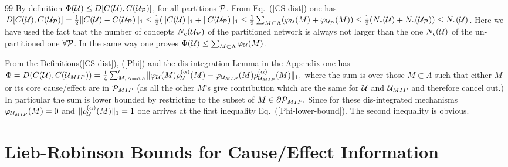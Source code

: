 \documentclass[aps,pra,groupaddress]{revtex4-1}
\begin{document}
\begin{thebibliography}{99}
By definition $\Phi({\cal U})\le D[ C({\cal U}), C({\cal U}_{\cal P})]$,  for all partitions $\cal P$.
From Eq.~(\ref{CS-dist}) one has $D[ C({\cal U}), C({\cal U}_{\cal P})]= \frac{1}{2}\| C({\cal U}) -C({\cal U}_{\cal P}) \|_1\le \frac{1}{2} (\| C({\cal U}) \|_1+\| C({\cal U}_{\cal P}) \|_1\le \frac{1}{2} \sum_{M\subset \Lambda} (\varphi_{\cal U}(M)+ \varphi_{{\cal U}_{\cal P}}(M) )\le \frac{1}{2}  (N_c({\cal U}) +N_c({\cal U}_{\cal P}) )\le N_c({\cal U})$. Here we have used the fact that the number of concepts $N_c({\cal U}_{\cal P})$ of the partitioned network is always not larger than the one $N_c({\cal U})$ of the un-partitioned one $\forall{\cal P}$. In the same way one proves $ \Phi({\cal U})\le  \sum_{M\subset \Lambda} \varphi_{\cal U}(M)$.

 From the Definitions(\ref{CS-dist}), (\ref{Phi}) and the dis-integration Lemma in the Appendix  one has
$\Phi=D(C({\cal U}),C({\cal U}_{MIP}))=\frac{1}{4}\sum_{M,\,\alpha=e,c}^\prime\|\varphi_{\cal U}(M)\rho_{\cal U}^{(\alpha)}(M)-\varphi_{{\cal U}_{MIP}}(M)
 \rho_{{\cal U}_{MIP}}^{(\alpha)}(M)\|_1,$ where the sum is over those $M\subset\Lambda$ such that either $M$ or its core cause/effect are in ${\cal P}_{MIP}$
(as all the other $M$'s give contribution which  are the same for ${\cal U}$ and ${\cal U}_{MIP}$ and therefore cancel out.) In particular the sum is lower bounded
by restricting to the subset of $M\in\partial{\cal P}_{MIP}.$ Since for these dis-integrated mechanisms $\varphi_{{\cal U}_{MIP}}(M)=0$ 
and $\|\rho_{\cal U}^{(\alpha)}(M)\|_1=1$ one arrives at the first inequality Eq.~(\ref{Phi-lower-bound}). The second inequality is obvious.





\end{thebibliography}
\appendix
\section{Lieb-Robinson Bounds for Cause/Effect Information}
\label{sec:sup2}
\end{document}
